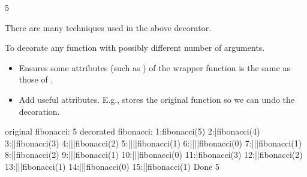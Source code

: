 \documentclass[letterpaper,10pt,english]{sphinxmanual}
\begin{document}
\begin{sphinxVerbatim}[commandchars=\\\{\}]
5
\end{sphinxVerbatim}

There are many techniques used in the above decorator.


To decorate any function with possibly different number of arguments.

\begin{itemize}
\item {} 
Ensures some attributes (such as ) of the wrapper function is the same as those of .

\item {} 
Add useful attributes. E.g.,  stores the original function so we can undo the decoration.

\end{itemize}

\begin{sphinxVerbatim}[commandchars=\\\{\}]
      

    
\end{sphinxVerbatim}

\begin{sphinxVerbatim}[commandchars=\\\{\}]
original fibonacci:
5
decorated fibonacci:
  1:fibonacci(5)
  2:|fibonacci(4)
  3:||fibonacci(3)
  4:|||fibonacci(2)
  5:||||fibonacci(1)
  6:||||fibonacci(0)
  7:|||fibonacci(1)
  8:||fibonacci(2)
  9:|||fibonacci(1)
 10:|||fibonacci(0)
 11:|fibonacci(3)
 12:||fibonacci(2)
 13:|||fibonacci(1)
 14:|||fibonacci(0)
 15:||fibonacci(1)
Done
5
\end{sphinxVerbatim}
\end{document}
